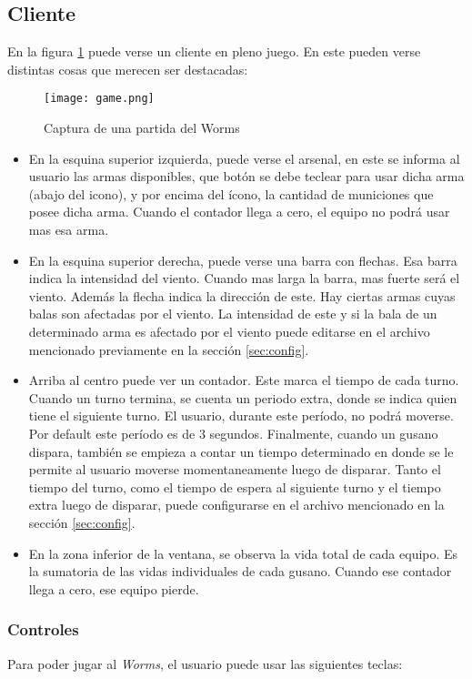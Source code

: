 \subsection{Cliente}
En la figura \ref{im:juego} puede verse un cliente en pleno juego. En este pueden verse distintas cosas que merecen ser destacadas:

\begin{figure}[H]
	\centering
	\texttt{[image: game.png]}
	\caption{Captura de una partida del Worms}
	\label{im:juego}
\end{figure}

\begin{itemize}
	\item En la esquina superior izquierda, puede verse el arsenal, en este se informa al usuario las armas disponibles, que botón se debe teclear para usar dicha arma (abajo del icono), y por encima del ícono, la cantidad de municiones que posee dicha arma. Cuando el contador llega a cero, el equipo no podrá usar mas esa arma.
	\item En la esquina superior derecha, puede verse una barra con flechas. Esa barra indica la intensidad del viento. Cuando mas larga la barra, mas fuerte será el viento. Además la flecha indica la dirección de este. Hay ciertas armas cuyas balas son afectadas por el viento. La intensidad de este y si la bala de un determinado arma es afectado por el viento puede editarse en el archivo mencionado previamente en la sección \ref{sec:config}. 
	\item Arriba al centro puede ver un contador. Este marca el tiempo de cada turno. Cuando un turno termina, se cuenta un periodo extra, donde se indica quien tiene el siguiente turno. El usuario, durante este período, no podrá moverse. Por default este período es de 3 segundos. Finalmente, cuando un gusano dispara, también se empieza a contar un tiempo determinado en donde se le permite al usuario moverse momentaneamente luego de disparar. Tanto el tiempo del turno, como el tiempo de espera al siguiente turno y el tiempo extra luego de disparar, puede configurarse en el archivo mencionado en la sección \ref{sec:config}.
	\item En la zona inferior de la ventana, se observa la vida total de cada equipo. Es la sumatoria de las vidas individuales de cada gusano. Cuando ese contador llega a cero, ese equipo pierde.
\end{itemize}

\subsubsection{Controles}
Para poder jugar al \emph{Worms}, el usuario puede usar las siguientes teclas:

